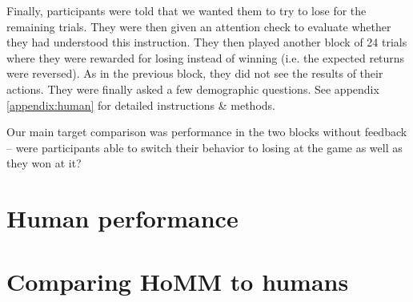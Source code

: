 Finally, participants were told that we wanted them to try to lose for the remaining trials. They were then given an attention check to evaluate whether they had understood this instruction. They then played another block of 24 trials where they were rewarded for losing instead of winning (i.e. the expected returns were reversed). As in the previous block, they did not see the results of their actions. They were finally asked a few demographic questions. See appendix \ref{appendix:human} for detailed instructions \& methods.\par
Our main target comparison was performance in the two blocks without feedback -- were participants able to switch their behavior to losing at the game as well as they won at it?\par


\section{Human performance}

\section{Comparing HoMM to humans}
